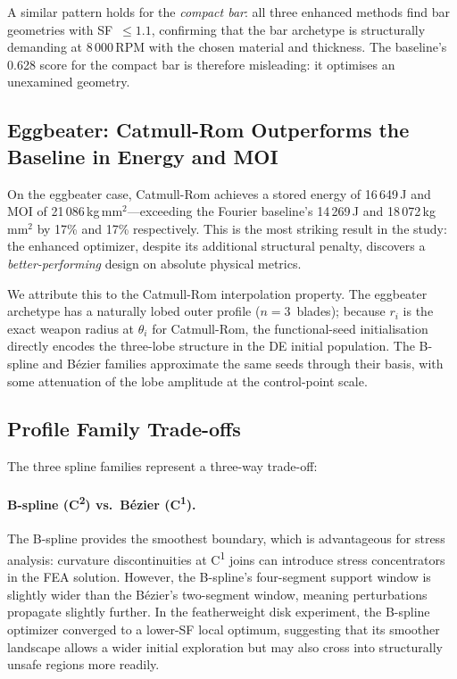 \documentclass[10pt,twocolumn]{article}
\begin{document}
A similar pattern holds for the \emph{compact bar}: all three enhanced methods
find bar geometries with SF~$\leq 1.1$, confirming that the bar archetype is
structurally demanding at 8\,000\,RPM with the chosen material and thickness.
The baseline's 0.628 score for the compact bar is therefore misleading: it
optimises an unexamined geometry.

\subsection{Eggbeater: Catmull-Rom Outperforms the Baseline in Energy and MOI}
\label{sec:discuss_egg}

On the eggbeater case, Catmull-Rom achieves a stored energy of 16\,649\,J and
MOI of 21\,086\,kg\,mm$^2$---exceeding the Fourier baseline's 14\,269\,J and
18\,072\,kg\,mm$^2$ by 17\% and 17\% respectively.  This is the most striking
result in the study: the enhanced optimizer, despite its additional structural
penalty, discovers a \emph{better-performing} design on absolute physical
metrics.

We attribute this to the Catmull-Rom interpolation property.  The eggbeater
archetype has a naturally lobed outer profile ($n=3$~blades); because
$r_i$ is the exact weapon radius at $\theta_i$ for Catmull-Rom, the
functional-seed initialisation directly encodes the three-lobe structure in
the DE initial population.  The B-spline and B\'{e}zier families approximate
the same seeds through their basis, with some attenuation of the lobe
amplitude at the control-point scale.

\subsection{Profile Family Trade-offs}
\label{sec:discuss_profiles}

The three spline families represent a three-way trade-off:

\paragraph{B-spline (C\textsuperscript{2}) vs.\ B\'{e}zier (C\textsuperscript{1}).}
The B-spline provides the smoothest boundary, which is advantageous for stress
analysis: curvature discontinuities at C\textsuperscript{1} joins can
introduce stress concentrators in the FEA solution.  However, the B-spline's
four-segment support window is slightly wider than the B\'{e}zier's two-segment
window, meaning perturbations propagate slightly further.  In the featherweight
disk experiment, the B-spline optimizer converged to a lower-SF local optimum,
suggesting that its smoother landscape allows a wider initial exploration but
may also cross into structurally unsafe regions more readily.
\end{document}
